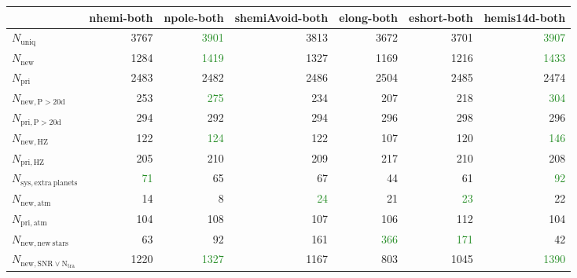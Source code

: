 \begin{tabular}{lrrrrrr}
\toprule
{} &  nhemi-both &  npole-both &  shemiAvoid-both &  elong-both &  eshort-both &  hemis14d-both \\
\midrule
$N_{\mathrm{uniq}}$                &        3767 &        \textcolor{ForestGreen}{3901} &             3813 &        3672 &         3701 &           \textcolor{ForestGreen}{3907} \\
$N_{\mathrm{new}}$                 &        1284 &        \textcolor{ForestGreen}{1419} &             1327 &        1169 &         1216 &           \textcolor{ForestGreen}{1433} \\
$N_{\mathrm{pri}}$                 &        2483 &        2482 &             2486 &        2504 &         2485 &           2474 \\
$N_{\mathrm{new,P>20d}}$           &         253 &         \textcolor{ForestGreen}{275} &              234 &         207 &          218 &            \textcolor{ForestGreen}{304} \\
$N_{\mathrm{pri,P>20d}}$           &         294 &         292 &              294 &         296 &          298 &            296 \\
$N_{\mathrm{new,HZ}}$              &         122 &         \textcolor{ForestGreen}{124} &              122 &         107 &          120 &            \textcolor{ForestGreen}{146} \\
$N_{\mathrm{pri,HZ}}$              &         205 &         210 &              209 &         217 &          210 &            208 \\
$N_{\mathrm{sys,extra\ planets}}$  &          \textcolor{ForestGreen}{71} &          65 &               67 &          44 &           61 &             \textcolor{ForestGreen}{92} \\
$N_{\mathrm{new,atm}}$             &         14 &         8 &              \textcolor{ForestGreen}{24} &         21 &          \textcolor{ForestGreen}{23} &            22 \\
$N_{\mathrm{pri,atm}}$             &         104 &         108 &              107 &         106 &          112 &            104 \\
$N_{\mathrm{new,new\ stars}}$      &          63 &          92 &              161 &         \textcolor{ForestGreen}{366} &          \textcolor{ForestGreen}{171} &             42 \\
$N_{\mathrm{new,SNR\lor N_{tra}}}$ &        1220 &        \textcolor{ForestGreen}{1327} &             1167 &         803 &         1045 &           \textcolor{ForestGreen}{1390} \\
\bottomrule
\end{tabular}
